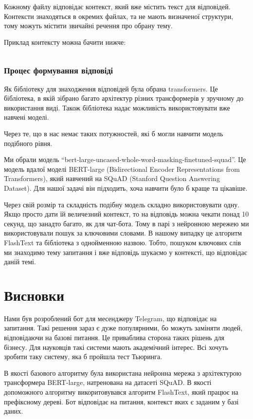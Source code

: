 \documentclass[a4paper,14pt]{extreport}
\newcommand\chap[1]{%
  \chapter*{#1}%
  \addcontentsline{toc}{chapter}{\uppercase{#1}}}
\begin{document}
    Кожному файлу відповідає контекст, який вже містить текст для відповідей. Контексти знаходяться в окремих файлах, та не мають визначеної структури, тому можуть містити звичайні речення про обрану тему.

    Приклад контексту можна бачити нижче:

    \inputminted[breaklines,linenos=true]{text}{./ai.txt}

    \subsection{Процес формування відповіді}
    Як бібліотеку для знаходження відповідей була обрана transformers. Це бібліотека, в якій зібрано багато архітектур різних трансформерів у зручному до використання виді. Також бібліотека надає можливість використовувати вже навчені моделі.
    
    Через те, що в нас немає таких потужностей, які б могли навчити модель подібного рівня.

    Ми обрали модель ``bert-large-uncased-whole-word-masking-finetuned-squad''. Це модель вдалої моделі BERT-large (Bidirectional Encoder Representations from Transformers), який навчений на SQuAD (Stanford Question Answering Dataset). Для нашої задачі він підходить, хоча навчити було б краще та цікавіше.

    Через свій розмір та складність подібну модель складно використовувати одну. Якщо просто дати їй величезний контекст, то на відповідь можна чекати понад 10 секунд, що занадто багато, як для чат-бота. Тому в парі з нейронною мережею ми використовували пошук за ключовими словами. В нашому випадку це алгоритм FlashText та бібліотека з однойменною назвою. Тобто, пошуком ключових слів ми знаходимо тему запитання і вже відповідь шукаємо у контексті, що відповідає даній темі.

\chap{Висновки}
    Нами був розроблений бот для месенджеру Telegram, що відповідає на запитання. Такі решення зараз є дуже популярними, бо можуть заміняти людей, відповідаючи на базові питання. Це приваблива сторона таких рішень для бізнесу. Для науковців такі системи мають академічний інтерес. Всі хочуть зробити таку систему, яка б пройшла тест Тьюринга.
    
    В якості базового алгоритму була використана нейронна мережа з архітектурою трансформера BERT-large, натренована на датасеті SQuAD. В якості допоможного алгоритму викоритовувався алгоритм FlashText, який працює на префіксному дереві. Бот відповідає на питання, контекст яких є заданим у базі даних.
\end{document}
